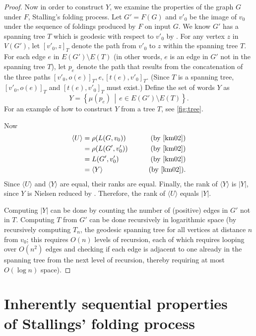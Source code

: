 \documentclass{article}
\newcommand{\gen}[1]{\langle #1 \rangle}
\begin{document}
\begin{proof}
  Now in order to construct $Y$, we examine the properties of the graph $G$ under $F$, Stalling's folding process.
  Let $G' = F(G)$ and $v'_0$ be the image of $v_0$ under the sequence of foldings produced by $F$ on input $G$.
  We know $G'$ has a spanning tree $T$ which is geodesic with respect to $v'_0$ by \cite[Lemma~6.6]{km02}.
  For any vertex $z$ in $V(G')$, let $[v'_0, z]_T$ denote the path from $v'_0$ to $z$ within the spanning tree $T$.
  For each edge $e$ in $E(G') \setminus E(T)$ (in other words, $e$ is an edge in $G'$ not in the spanning tree $T$), let $p_e$ denote the path that results from the concatenation of the three paths $[v'_0, o(e)]_T, e, [t(e), v'_0]_T$.
  (Since $T$ is a spanning tree, $[v'_0, o(e)]_T$ and $[t(e), v'_0]_T$ must exist.)
  Define the set of words $Y$ as
  \begin{equation*}
    Y = \left\{\mu(p_e) \, \middle| \, e \in E(G') \setminus E(T) \right\}.
  \end{equation*}
  For an example of how to construct $Y$ from a tree $T$, see \autoref{fig:tree}.
  
  Now
  \begin{align*}
    \gen{U} & = \rho(L(G, v_0)) & \qquad \text{(by \cite[Proposition~3.8]{km02})} \\
            & = \rho(L(G', v'_0)) & \qquad \text{(by \cite[Lemma~3.4]{km02})} \\
            & = L(G', v'_0) & \qquad \text{(by \cite[Lemma~2.9]{km02})} \\
            & = \gen{Y} & \qquad \text{(by \cite[Lemma~6.1]{km02})}.
  \end{align*}
  Since $\gen{U}$ and $\gen{Y}$ are equal, their ranks are equal.
  Finally, the rank of $\gen{Y}$ is $|Y|$, since $Y$ is Nielsen reduced by \cite[Proposition~6.7]{km02}.
  Therefore, the rank of $\gen{U}$ equals $|Y|$.

  Computing $|Y|$ can be done by counting the number of (positive) edges in $G'$ not in $T$.
  Computing $T$ from $G'$ can be done recursively in logarithmic space (by recursively computing $T_n$, the geodesic spanning tree for all vertices at distance $n$ from $v_0$; this requires $O(n)$ levels of recursion, each of which requires looping over $O(n^2)$ edges and checking if each edge is adjacent to one already in the spanning tree from the next level of recursion, thereby requiring at most $O(\log n)$ space).
\end{proof}

\section[Inherently sequential properties of Stallings' folding process]{Inherently sequential properties \\ of Stallings' folding process}
\end{document}
